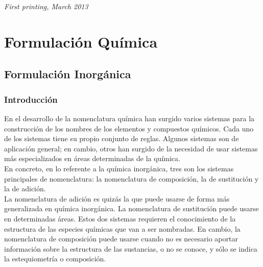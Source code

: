 \documentclass[11pt,fleqn]{book} %
\begin{document}
\noindent \textit{First printing, March 2013} %




\pagestyle{empty} %

\tableofcontents %

\cleardoublepage %

\pagestyle{fancy} %


\part{Formulación Química}



\chapter{Formulación Inorgánica}

\section{Introducción}
En el desarrollo de la nomenclatura química han surgido varios sistemas para la construcción de los nombres de los elementos y compuestos químicos. Cada uno de los sistemas tiene su propio conjunto de reglas. Algunos sistemas son de aplicación general; en cambio, otros han surgido de la necesidad de usar sistemas más especializados en áreas determinadas de la química.\\
En concreto, en lo referente a la química inorgánica, tres son los sistemas principales de nomenclatura: la nomenclatura de composición, la de sustitución y la de adición.\\
La nomenclatura de adición es quizás la que puede usarse de forma más generalizada en química inorgánica. La nomenclatura de sustitución puede usarse en determinadas áreas. Estos dos sistemas requieren el conocimiento de la estructura de las especies químicas que van a ser nombradas. En cambio, la nomenclatura de composición puede usarse cuando no es necesario aportar información sobre la estructura de las sustancias, o no se conoce, y sólo se indica la estequiometría o composición.
\end{document}
